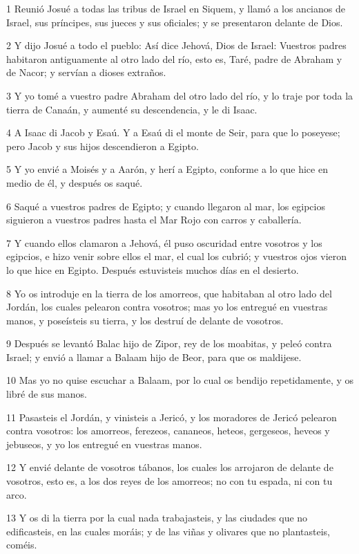 \par 1 Reunió Josué a todas las tribus de Israel en Siquem, y llamó a los ancianos de Israel, sus príncipes, sus jueces y sus oficiales; y se presentaron delante de Dios.
\par 2 Y dijo Josué a todo el pueblo: Así dice Jehová, Dios de Israel: Vuestros padres habitaron antiguamente al otro lado del río, esto es, Taré, padre de Abraham y de Nacor; y servían a dioses extraños.
\par 3 Y yo tomé a vuestro padre Abraham del otro lado del río, y lo traje por toda la tierra de Canaán, y aumenté su descendencia, y le di Isaac. 
\par 4 A Isaac di Jacob y Esaú. Y a Esaú di el monte de Seir, para que lo poseyese; pero Jacob y sus hijos descendieron a Egipto. 
\par 5 Y yo envié a Moisés y a Aarón, y herí a Egipto, conforme a lo que hice en medio de él, y después os saqué.
\par 6 Saqué a vuestros padres de Egipto; y cuando llegaron al mar, los egipcios siguieron a vuestros padres hasta el Mar Rojo con carros y caballería.
\par 7 Y cuando ellos clamaron a Jehová, él puso oscuridad entre vosotros y los egipcios, e hizo venir sobre ellos el mar, el cual los cubrió; y vuestros ojos vieron lo que hice en Egipto. Después estuvisteis muchos días en el desierto.
\par 8 Yo os introduje en la tierra de los amorreos, que habitaban al otro lado del Jordán, los cuales pelearon contra vosotros; mas yo los entregué en vuestras manos, y poseísteis su tierra, y los destruí de delante de vosotros. 
\par 9 Después se levantó Balac hijo de Zipor, rey de los moabitas, y peleó contra Israel; y envió a llamar a Balaam hijo de Beor, para que os maldijese.
\par 10 Mas yo no quise escuchar a Balaam, por lo cual os bendijo repetidamente, y os libré de sus manos.
\par 11 Pasasteis el Jordán, y vinisteis a Jericó, y los moradores de Jericó pelearon contra vosotros: los amorreos, ferezeos, cananeos, heteos, gergeseos, heveos y jebuseos, y yo los entregué en vuestras manos.
\par 12 Y envié delante de vosotros tábanos, los cuales los arrojaron de delante de vosotros, esto es, a los dos reyes de los amorreos; no con tu espada, ni con tu arco.
\par 13 Y os di la tierra por la cual nada trabajasteis, y las ciudades que no edificasteis, en las cuales moráis; y de las viñas y olivares que no plantasteis, coméis. 
